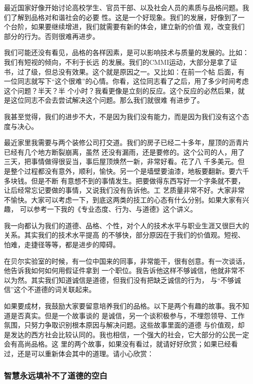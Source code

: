\documentclass[11pt]{article}
\begin{document}
最近国家好像开始讨论高校学生、官员干部、以及社会人员的素质与品格问题。我们了解到品格对和谐社会的必要
性。这是一个好现象。我们的发展，好像到了一个台阶，如果要继续增进，我们就需要有新的体会，建立新的价值
观，改变我们部分的行为。否则很难再进步。 

我们可能还没有看见，品格的各样因素，是可以影响技术与质量的发展的。比如：我们有短视的倾向，不利于长远
的发展。我们的CMMI运动，大部分是拿了证书，过了级，但总没有效果。这个就是原因之一。又比如：在前一个帖
后面，有一位同志就写下“这个很难”的心情。你看，这位同志看了之后，用了多少时间考虑这个问题？半天？半
个小时？我看更像是立刻的反应。这个反应的必然后果，就是这位同志不会去尝试解决这个问题。那么我们就很难
有进步了。
 
我甚至觉得，我们的进步不大，不是因为我们没有能力，而是因为我们没有这个态度与决心。
 
最近家里我需要与两个装修公司打交道。我们的房子已经二十多年，屋顶的沥青片已经有几个地方断裂崩离，虽然
还没有漏雨，还是要修的。这个公司的人，用了三天，把事情做得很妥当，事后屋顶焕然一新，非常好看。花了八
千多美元。但是整个过程都没有意外，顺利，愉快。另一个是墙壁要油漆，地板要翻新。要六千多块钱。但是不断
有意想不到的事情发生。把要做得东西写好一个字条就不要，让后经常忘记要做的事情，又说我们没有告诉他。工
艺质量非常不好。大家非常不愉快。大家可以考虑一下，到底这两类的技工的心态有什么分别。如果大家有兴趣，
可以参考一下我的《专业态度、行为、与道德》这个讲义。

 
我一向都认为我们的道德、品格、个性，对个人的技术水平与职业生涯又很巨大的关系。其实我们的技术水平提高
的不够快，部分原因在于我们的价值观。短视、怕难，走捷径等等，都是进步的障碍。
 
在贝尔实验室的时候，有一位中国来的同事，非常能干，很有创意。有一次谈话，他告诉我如何如何用假证件拿到
一个职位。我告诉他这样不够诚信，他就非常不以为然。其实我们知道诚信是道德，但我们没有把缺乏诚信的行为，
与“不够诚信”这个不道德的词关联起来。
 
如果要成材，我鼓励大家要留意培养我们的品格。以下是两个有趣的故事。我不知道是否真实。但是一个故事谈的
是诚信，另一个谈积极参与，不埋怨领导、工作氛围，只努力争取识别根本原因与解决问题。这些故事里面的道德
与价值观，却是发达的西方社会比较认同的。我也相信，一个强大的社会，它大部分的公民一定会有高尚品格。这
里的两个故事，如果没有看过，就请好好欣赏；如果已经看过，还是可以重新体会其中的道理。请小心欣赏：
 
\subsubsection{智慧永远填补不了道德的空白}
 
\end{document}
